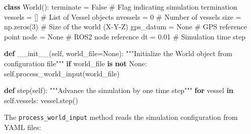 \documentclass[
  letterpaper,
  DIV=11,
  numbers=noendperiod]{scrreprt}
\newenvironment{Shaded}{\begin{snugshade}}{\end{snugshade}}
\newcommand{\CommentTok}[1]{\textcolor[rgb]{0.37,0.37,0.37}{#1}}
\newcommand{\ControlFlowTok}[1]{\textcolor[rgb]{0.00,0.23,0.31}{\textbf{#1}}}
\newcommand{\DecValTok}[1]{\textcolor[rgb]{0.68,0.00,0.00}{#1}}
\newcommand{\FloatTok}[1]{\textcolor[rgb]{0.68,0.00,0.00}{#1}}
\newcommand{\FunctionTok}[1]{\textcolor[rgb]{0.28,0.35,0.67}{#1}}
\newcommand{\KeywordTok}[1]{\textcolor[rgb]{0.00,0.23,0.31}{\textbf{#1}}}
\newcommand{\NormalTok}[1]{\textcolor[rgb]{0.00,0.23,0.31}{#1}}
\newcommand{\OperatorTok}[1]{\textcolor[rgb]{0.37,0.37,0.37}{#1}}
\newcommand{\VariableTok}[1]{\textcolor[rgb]{0.07,0.07,0.07}{#1}}
\begin{document}
\begin{Shaded}
\begin{Highlighting}[]
\KeywordTok{class}\NormalTok{ World():}
\NormalTok{    terminate }\OperatorTok{=} \VariableTok{False}                   \CommentTok{\# Flag indicating simulation termination}
\NormalTok{    vessels }\OperatorTok{=}\NormalTok{ []                        }\CommentTok{\# List of Vessel objects}
\NormalTok{    nvessels }\OperatorTok{=} \DecValTok{0}                        \CommentTok{\# Number of vessels}
\NormalTok{    size }\OperatorTok{=}\NormalTok{ np.zeros(}\DecValTok{3}\NormalTok{)                  }\CommentTok{\# Size of the world (X{-}Y{-}Z)}
\NormalTok{    gps\_datum }\OperatorTok{=} \VariableTok{None}                    \CommentTok{\# GPS reference point}
\NormalTok{    node }\OperatorTok{=} \VariableTok{None}                         \CommentTok{\# ROS2 node reference}
\NormalTok{    dt }\OperatorTok{=} \FloatTok{0.01}                           \CommentTok{\# Simulation time step}

    \KeywordTok{def} \FunctionTok{\_\_init\_\_}\NormalTok{(}\VariableTok{self}\NormalTok{, world\_file}\OperatorTok{=}\VariableTok{None}\NormalTok{):}
        \CommentTok{"""Initialize the World object from configuration file"""}
        \ControlFlowTok{if}\NormalTok{ world\_file }\KeywordTok{is} \KeywordTok{not} \VariableTok{None}\NormalTok{:}
            \VariableTok{self}\NormalTok{.process\_world\_input(world\_file)}
    
    \KeywordTok{def}\NormalTok{ step(}\VariableTok{self}\NormalTok{):}
        \CommentTok{"""Advance the simulation by one time step"""}
        \ControlFlowTok{for}\NormalTok{ vessel }\KeywordTok{in} \VariableTok{self}\NormalTok{.vessels:}
\NormalTok{            vessel.step()}
\end{Highlighting}
\end{Shaded}

The \texttt{process\_world\_input} method reads the simulation
configuration from YAML files:
\end{document}
